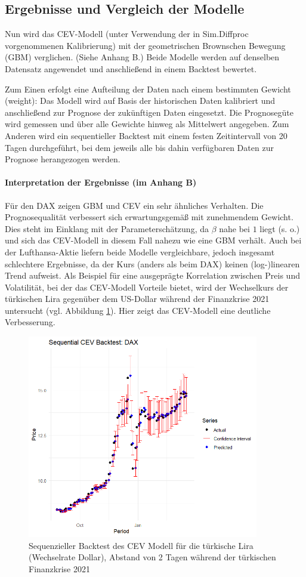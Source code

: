 \subsection{Ergebnisse und Vergleich der Modelle}

Nun wird das CEV-Modell (unter Verwendung der in Sim.Diffproc vorgenommenen Kalibrierung) mit der geometrischen Brownschen Bewegung (GBM) verglichen. (Siehe Anhang B.) Beide Modelle werden auf denselben Datensatz angewendet und anschließend in einem Backtest bewertet.

Zum Einen erfolgt eine Aufteilung der Daten nach einem bestimmten Gewicht (weight): Das Modell wird auf Basis der 
historischen Daten kalibriert und anschließend zur Prognose der zukünftigen Daten eingesetzt. Die Prognosegüte 
wird gemessen und über alle Gewichte hinweg als Mittelwert angegeben.
Zum Anderen wird ein sequentieller Backtest mit einem festen Zeitintervall von 20 Tagen durchgeführt, bei dem jeweils 
alle bis dahin verfügbaren Daten zur Prognose herangezogen werden.

\paragraph{Interpretation der Ergebnisse (im Anhang B)}
Für den DAX zeigen GBM und CEV ein sehr ähnliches Verhalten. Die Prognosequalität verbessert sich erwartungsgemäß 
mit zunehmendem Gewicht. Dies steht im Einklang mit der Parameterschätzung, da $\beta$ nahe bei $1$ liegt (s. o.) und 
sich das CEV-Modell in diesem Fall nahezu wie eine GBM verhält.
Auch bei der Lufthansa-Aktie liefern beide Modelle vergleichbare, jedoch insgesamt schlechtere Ergebnisse, da der 
Kurs (anders als beim DAX) keinen (log-)linearen Trend aufweist.
Als Beispiel für eine ausgeprägte Korrelation zwischen Preis und Volatilität, bei der das CEV-Modell 
Vorteile bietet, wird der Wechselkurs der türkischen Lira gegenüber dem US-Dollar während der Finanzkrise 2021 untersucht (vgl. Abbildung \ref{fig:cev_try}). Hier zeigt das CEV-Modell eine deutliche Verbesserung.

\begin{figure}[H]
    \centering
    \includegraphics[width=0.9\textwidth]{images/cev_try.png}
    \caption{Sequenzieller Backtest des CEV Modell für die türkische Lira (Wechselrate Dollar), Abstand von 2 Tagen während der türkischen Finanzkrise 2021}
    \label{fig:cev_try}
\end{figure}